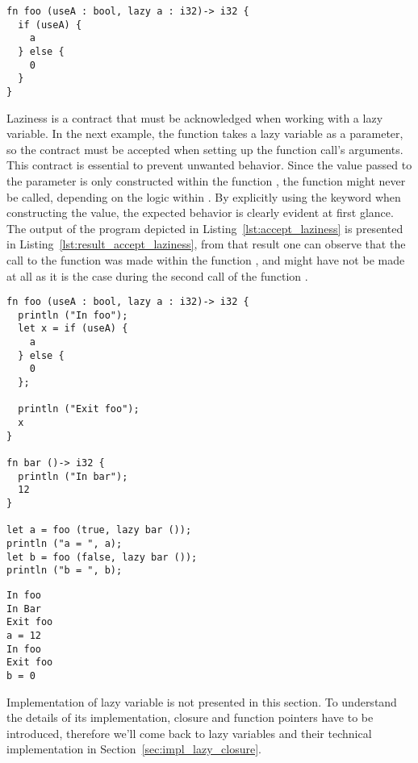 \begin{lstlisting}[style=coloredverbatim]
fn foo (useA : bool, lazy a : i32)-> i32 {
  if (useA) {
    a
  } else {
    0
  }
}
\end{lstlisting}

Laziness is a contract that must be acknowledged when working with a lazy
variable. In the next example, the function  takes a lazy variable as
a parameter, so the contract must be accepted when setting up the function
call's arguments. This contract is essential to prevent unwanted behavior. Since
the value passed to the parameter  is only constructed within the
function , the function  might never be called, depending
on the logic within . By explicitly using the  keyword
when constructing the value, the expected behavior is clearly evident at first
glance. The output of the program depicted in Listing~\ref{lst:accept_laziness}
is presented in Listing~\ref{lst:result_accept_laziness}, from that result one
can observe that the call to the function  was made within the
function , and might have not be made at all as it is the case during
the second call of the function .

\begin{lstlisting}[style=coloredverbatim, label=lst:accept_laziness, caption=Example of laziness contract acceptance]
fn foo (useA : bool, lazy a : i32)-> i32 {
  println ("In foo");
  let x = if (useA) {
    a
  } else {
    0
  };

  println ("Exit foo");
  x
}

fn bar ()-> i32 {
  println ("In bar");
  12
}

let a = foo (true, lazy bar ());
println ("a = ", a);
let b = foo (false, lazy bar ());
println ("b = ", b);
\end{lstlisting}

\begin{lstlisting}[style=bashVerb, caption=Result of execution of Listing~\ref{lst:accept_laziness}, label=lst:result_accept_laziness]
In foo
In Bar
Exit foo
a = 12
In foo
Exit foo
b = 0
\end{lstlisting}

Implementation of lazy variable is not presented in this section. To understand
the details of its implementation, closure and function pointers have to be
introduced, therefore we'll come back to lazy variables and their technical
implementation in Section~\ref{sec:impl_lazy_closure}.


